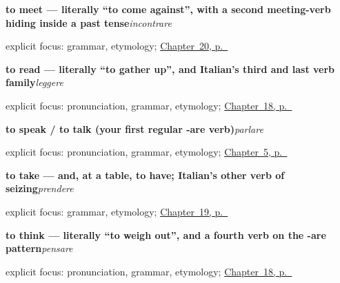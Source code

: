\noindent\begin{minipage}[t]{\linewidth}
\raggedright
\textbf{to meet — literally \textquotedblleft{}to come against\textquotedblright{}, with a second meeting-verb hiding inside a past tense}\enspace\emph{incontrare}\par
\footnotesize explicit focus: grammar, etymology; \hyperref[ch:it-carry-buy-wait-meet]{Chapter~20, p.~\pageref*{ch:it-carry-buy-wait-meet}}
\end{minipage}\par\smallskip

\noindent\begin{minipage}[t]{\linewidth}
\raggedright
\textbf{to read — literally \textquotedblleft{}to gather up\textquotedblright{}, and Italian's third and last verb family}\enspace\emph{leggere}\par
\footnotesize explicit focus: pronunciation, grammar, etymology; \hyperref[ch:it-mind-verbs]{Chapter~18, p.~\pageref*{ch:it-mind-verbs}}
\end{minipage}\par\smallskip

\noindent\begin{minipage}[t]{\linewidth}
\raggedright
\textbf{to speak / to talk (your first regular -are verb)}\enspace\emph{parlare}\par
\footnotesize explicit focus: pronunciation, grammar, etymology; \hyperref[ch:it-first-verbs]{Chapter~5, p.~\pageref*{ch:it-first-verbs}}
\end{minipage}\par\smallskip

\noindent\begin{minipage}[t]{\linewidth}
\raggedright
\textbf{to take — and, at a table, to have; Italian's other verb of seizing}\enspace\emph{prendere}\par
\footnotesize explicit focus: grammar, etymology; \hyperref[ch:it-backwards-verb]{Chapter~19, p.~\pageref*{ch:it-backwards-verb}}
\end{minipage}\par\smallskip

\noindent\begin{minipage}[t]{\linewidth}
\raggedright
\textbf{to think — literally \textquotedblleft{}to weigh out\textquotedblright{}, and a fourth verb on the -are pattern}\enspace\emph{pensare}\par
\footnotesize explicit focus: pronunciation, grammar, etymology; \hyperref[ch:it-mind-verbs]{Chapter~18, p.~\pageref*{ch:it-mind-verbs}}
\end{minipage}\par\smallskip

